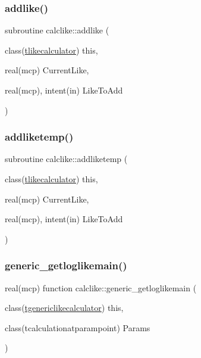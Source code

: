 \subsubsection{\texorpdfstring{addlike()}{addlike()}}
{\footnotesize\ttfamily subroutine calclike\+::addlike (\begin{DoxyParamCaption}\item[{class(\mbox{\hyperlink{structcalclike_1_1tlikecalculator}{tlikecalculator}})}]{this,  }\item[{real(mcp)}]{Current\+Like,  }\item[{real(mcp), intent(in)}]{Like\+To\+Add }\end{DoxyParamCaption})\hspace{0.3cm}{\ttfamily [private]}}

\mbox{\label{namespacecalclike_adb9f063355d18b2a50d8e0d3c061324b}} 
\subsubsection{\texorpdfstring{addliketemp()}{addliketemp()}}
{\footnotesize\ttfamily subroutine calclike\+::addliketemp (\begin{DoxyParamCaption}\item[{class(\mbox{\hyperlink{structcalclike_1_1tlikecalculator}{tlikecalculator}})}]{this,  }\item[{real(mcp)}]{Current\+Like,  }\item[{real(mcp), intent(in)}]{Like\+To\+Add }\end{DoxyParamCaption})\hspace{0.3cm}{\ttfamily [private]}}

\mbox{\label{namespacecalclike_ab9a99016f525f639358a942fb9885cc7}} 
\subsubsection{\texorpdfstring{generic\+\_\+getloglikemain()}{generic\_getloglikemain()}}
{\footnotesize\ttfamily real(mcp) function calclike\+::generic\+\_\+getloglikemain (\begin{DoxyParamCaption}\item[{class(\mbox{\hyperlink{structcalclike_1_1tgenericlikecalculator}{tgenericlikecalculator}})}]{this,  }\item[{class(tcalculationatparampoint)}]{Params }\end{DoxyParamCaption})\hspace{0.3cm}{\ttfamily [private]}}

